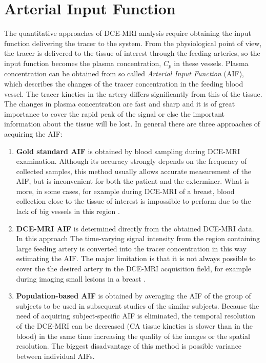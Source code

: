 \section{Arterial Input Function}
The quantitative approaches of DCE-MRI analysis require obtaining the input function delivering the tracer to the system. From the physiological point of view, the tracer is delivered to the tissue of interest through the feeding arteries, so the input function becomes the plasma concentration, $C_p$ in these vessels. Plasma concentration can be obtained from so called \textit{Arterial Input Function} (AIF), which describes the changes of the tracer concentration in the feeding blood vessel. The tracer kinetics in the artery differs significantly from this of the tissue. The changes in plasma concentration are fast and sharp and it is of great importance to cover the rapid peak of the signal or else the important information about the tissue will be lost.   
In general there are three approaches of acquiring the AIF:
\begin{enumerate}
\item{\textbf{Gold standard AIF}} is obtained by blood sampling during DCE-MRI examination.
Although its accuracy strongly depends on the frequency of collected samples, this method usually allows accurate measurement of the AIF, but is inconvenient for both the patient and the exterminer.
What is more, in some cases, for example during DCE-MRI of a breast, blood collection close to the tissue of interest is impossible to perform due to the lack of big vessels in this region \cite{khalifa2014models, barnes2012practical}. 
\item{\textbf{DCE-MRI AIF}} is determined directly from the obtained DCE-MRI data. In this approach The time-varying signal intensity from the region containing large feeding artery is converted into the tracer concentration in this way estimating the AIF. The major limitation is that it is not always possible to cover the the desired artery in the DCE-MRI acquisition field, for example during imaging small lesions in a breast \cite{khalifa2014models}.   
\item{\textbf{Population-based AIF}} is obtained by averaging the AIF of the group of subjects to be used in subsequent studies of the similar subjects. Because the need of acquiring subject-specific AIF is eliminated, the temporal resolution of the DCE-MRI can be decreased (CA tissue kinetics is slower than in the blood) in the same time increasing the quality of the images or the spatial resolution. The biggest disadvantage of this method is possible variance between individual AIFs. 
\end{enumerate}



